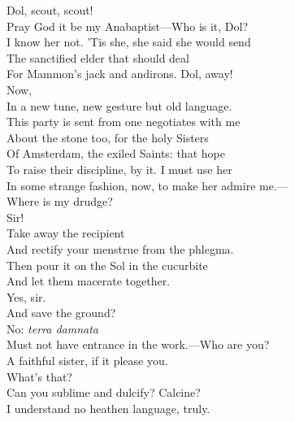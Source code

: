 \documentclass[a4paper,oneside,12pt]{memoir}
\begin{document}
\begin{drama*}
\subtlespeaks {} Dol, scout, scout!\\
Pray God it be my Anabaptist---Who is it, Dol?\\
\dolspeaks I know her not.
\subtlespeaks {} 'Tis she, she said she would send\\
The sanctified elder that should deal\\
For Mammon's jack and andirons. Dol, away!\\
 Now,\\
In a new tune, new gesture but old language.\\
This party is sent from one negotiates with me\\
About the stone too, for the holy Sisters\\
Of Amsterdam, the exiled Saints: that hope\\
To raise their discipline, by it. I must use her\\
In some strange fashion, now, to make her admire me.---\\
Where is my drudge?\\
\facespeaks {} Sir!\\
\subtlespeaks {} Take away the recipient\\
And rectify your menstrue from the phlegma.\\
Then pour it on the Sol in the cucurbite\\
And let them macerate together.\\
\facespeaks {} Yes, sir.\\
And save the ground?\\
\subtlespeaks {} No: \emph{terra damnata}\\
Must not have entrance in the work.---Who are you?\\
\persecutionspeaks A faithful sister, if it please you.\\
\subtlespeaks {} What's that?\\
Can you sublime and dulcify? Calcine?\\
\persecutionspeaks I understand no heathen language, truly.\\

\end{drama*}
\end{document}
